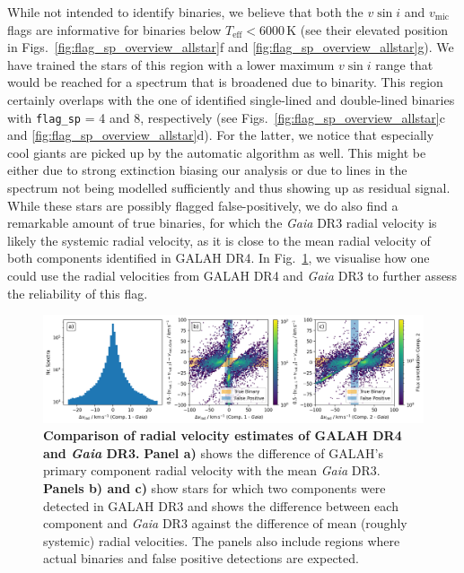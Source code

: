 \documentclass[
  journal=pasa,
  manuscript=research-paper, %
  year=2024,
  volume=37
]{cup-journal}
\newcommand{\vmic}{$v_\mathrm{mic}$\xspace}
\newcommand{\vsini}{$v \sin i$\xspace}
\newcommand{\Gaia}{\textit{Gaia}\xspace}
\begin{document}
While not intended to identify binaries, we believe that both the \vsini and \vmic flags are informative for binaries below $T_\mathrm{eff} < 6000\,\mathrm{K}$ (see their elevated position in Figs.~\ref{fig:flag_sp_overview_allstar}f and \ref{fig:flag_sp_overview_allstar}g). We have trained the stars of this region with a lower maximum \vsini range that would be reached for a spectrum that is broadened due to binarity. This region certainly overlaps with the one of identified single-lined and double-lined binaries with \texttt{flag\_sp} = 4 and 8, respectively (see Figs.~\ref{fig:flag_sp_overview_allstar}c and \ref{fig:flag_sp_overview_allstar}d). For the latter, we notice that especially cool giants are picked up by the automatic algorithm as well. This might be either due to strong extinction biasing our analysis or due to lines in the spectrum not being modelled sufficiently and thus showing up as residual signal. While these stars are possibly flagged false-positively, we do also find a remarkable amount of true binaries, for which the \Gaia DR3 radial velocity is likely the systemic radial velocity, as it is close to the mean radial velocity of both components identified in GALAH DR4. In Fig.~\ref{fig:vrad_comparison_comp1_comp2_gaiadr3}, we visualise how one could use the radial velocities from GALAH DR4 and \Gaia DR3 to further assess the reliability of this flag.

\begin{figure}[hbt]
\centering
\includegraphics[width=\textwidth]{figures/vrad_comparison_comp1_comp2_gaiadr3.png}
\caption{\textbf{Comparison of radial velocity estimates of GALAH DR4 and \textit{Gaia} DR3.} \textbf{Panel a)} shows the difference of GALAH's primary component radial velocity with the mean \textit{Gaia} DR3. \textbf{Panels b) and c)} show stars for which two components were detected in GALAH DR3 and shows the difference between each component and \textit{Gaia} DR3 against the difference of mean (roughly systemic) radial velocities. The panels also include regions where actual binaries and false positive detections are expected.}
\label{fig:vrad_comparison_comp1_comp2_gaiadr3}
\end{figure}
\end{document}
